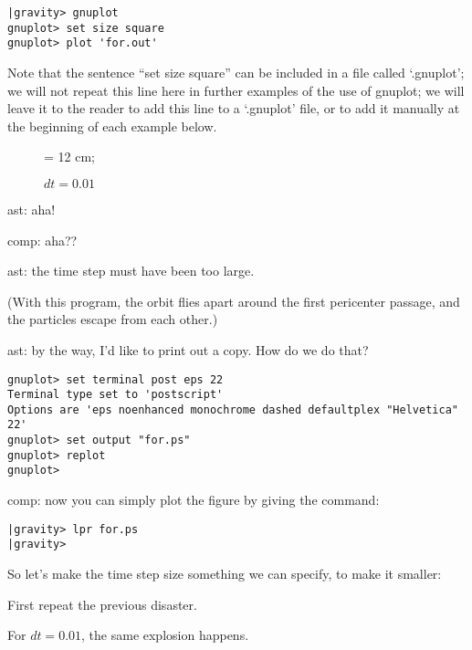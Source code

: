 \documentclass{book}
\def\code#1{{\small}}
\begin{document}
\begin{small}
\begin{verbatim}
|gravity> gnuplot
gnuplot> set size square
gnuplot> plot 'for.out'
\end{verbatim}
\end{small}

Note that the sentence ``set size square'' can be included in a file
called `.gnuplot'; we will not repeat this line here in further
examples of the use of gnuplot; we will leave it to the reader to add
this line to a `.gnuplot' file, or to add it manually at the beginning
of each example below.

\begin{figure}
\begin{center}
\leavevmode
\epsfxsize = 12 cm;
\caption{$dt = 0.01$}
\label{fig:for}
\end{center}
\end{figure}

ast: aha!

comp: aha??

ast: the time step must have been too large.

(With this program, the orbit flies apart around the first pericenter
passage, and the particles escape from each other.)

ast: by the way, I'd like to print out a copy.  How do we do that?

\begin{small}
\begin{verbatim}
gnuplot> set terminal post eps 22
Terminal type set to 'postscript'
Options are 'eps noenhanced monochrome dashed defaultplex "Helvetica" 22'
gnuplot> set output "for.ps"
gnuplot> replot
gnuplot> 
\end{verbatim}
\end{small}

comp: now you can simply plot the figure by giving the command:

\begin{small}
\begin{verbatim}
|gravity> lpr for.ps
|gravity>
\end{verbatim}
\end{small}

So let's make the time step size something we can specify, to make it
smaller:

\code{forward_euler2.C}

First repeat the previous disaster.

For $dt = 0.01$, the same explosion happens.
\end{document}
